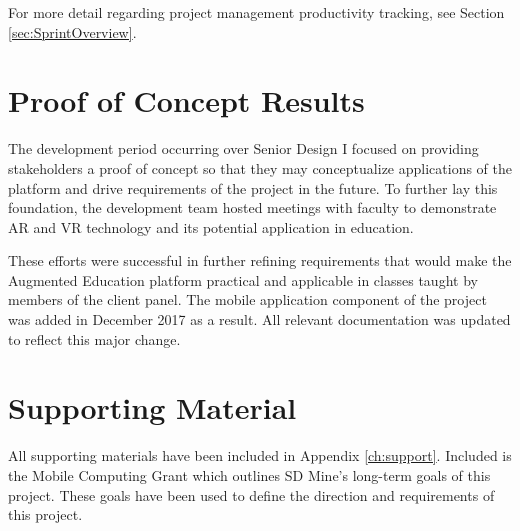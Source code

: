 For more detail regarding project management productivity tracking, see Section \ref{sec:SprintOverview}.

\section{Proof of Concept Results}


The development period occurring over Senior Design I focused on providing stakeholders a proof of concept so that they may conceptualize applications of the platform and drive requirements of the project in the future. To further lay this foundation, the development team hosted meetings with faculty to demonstrate AR and VR technology and its potential application in education. 

These efforts were successful in further refining requirements that would make the Augmented Education platform practical and applicable in classes taught by members of the client panel. The mobile application component of the project was added in December 2017 as a result. All relevant documentation was updated to reflect this major change. 

\section{Supporting Material}

All supporting materials have been included in Appendix \ref{ch:support}. Included is the Mobile Computing Grant which outlines SD Mine's long-term goals of this project. These goals have been used to define the direction and requirements of this project.
